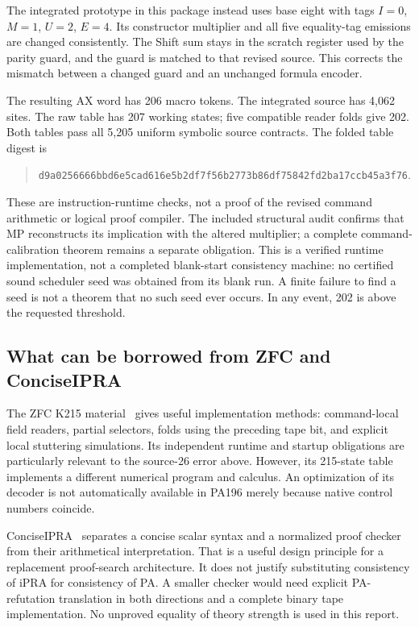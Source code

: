 \documentclass[11pt,a4paper]{article}
\begin{document}
The integrated prototype in this package instead uses base eight with
tags $I=0$, $M=1$, $U=2$, $E=4$. Its constructor multiplier and all five
equality-tag emissions are changed consistently. The Shift sum stays in
the scratch register used by the parity guard, and the guard is matched
to that revised source. This corrects the mismatch between a changed
guard and an unchanged formula encoder.

The resulting AX word has 206 macro tokens. The integrated source has
4,062 sites. The raw table has 207 working states; five compatible reader
folds give 202. Both tables pass all 5,205 uniform symbolic source
contracts. The folded table digest is
\begin{quote}\small
\nolinkurl{d9a0256666bbd6e5cad616e5b2df7f56b2773b86df75842fd2ba17ccb45a3f76}.
\end{quote}
These are instruction-runtime checks, not a proof of the revised command
arithmetic or logical proof compiler. The included structural audit
confirms that MP reconstructs its implication with the altered multiplier;
a complete command-calibration theorem remains a separate obligation.
This is a verified runtime implementation, not a completed blank-start
consistency machine: no certified sound scheduler seed was obtained from
its blank run. A finite failure to find a seed is not a theorem that no
such seed ever occurs. In any event, 202 is above the requested threshold.

\subsection{What can be borrowed from ZFC and ConciseIPRA}

The ZFC K215 material~\cite{zfc} gives useful implementation methods: command-local
field readers, partial selectors, folds using the preceding tape bit, and
explicit local stuttering simulations. Its independent runtime and startup
obligations are particularly relevant to the source-26 error above.
However, its 215-state table implements a different numerical program and
calculus. An optimization of its decoder is not automatically available
in PA196 merely because native control numbers coincide.

ConciseIPRA~\cite{ipra} separates a concise scalar syntax and a normalized proof
checker from their arithmetical interpretation. That is a useful design
principle for a replacement proof-search architecture. It does not justify
substituting consistency of iPRA for consistency of PA. A smaller checker
would need explicit PA-refutation translation in both directions and a
complete binary tape implementation. No unproved equality of theory
strength is used in this report.
\end{document}
